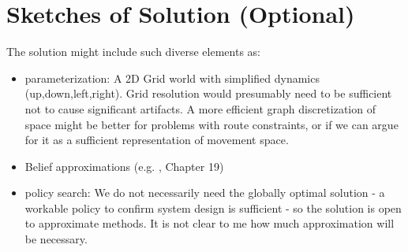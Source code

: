 \documentclass[twoside,11pt]{article}
\begin{document}
\section{Sketches of Solution (Optional)}
The solution might include such diverse elements as:

\begin{itemize}
\item parameterization: A 2D Grid world with simplified dynamics (up,down,left,right). Grid resolution would presumably need to be sufficient not to cause significant artifacts. A more efficient graph discretization of space might be better for problems with route constraints, or if we can argue for it as a sufficient representation of movement space.
\item Belief approximations (e.g. \citep{Kochenderfer2022}, Chapter 19)
\item policy search: We do not necessarily need the globally optimal solution  - a workable policy to confirm system design is sufficient - so the solution is open to approximate methods. It is not clear to me how much approximation will be necessary.
\end{itemize}


\end{document}
